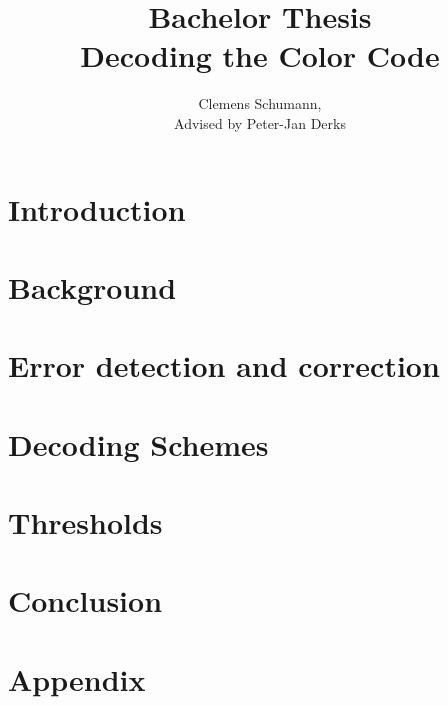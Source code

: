 \documentclass[12pt]{article}
\title{Bachelor Thesis\\ Decoding the Color Code}
\author{Clemens Schumann, \\
Advised by Peter-Jan Derks}
\begin{document}
\maketitle
\begin{abstract}
    \begin{center}
        
    \end{center}
\end{abstract}
\newpage

\tableofcontents
\newpage
\clearpage
{}
\setcounter{page}{1}
\section{Introduction}


\section{Background}\label{sec:background}

\newpage
\section{Error detection and correction}\label{sec:errordetection}

\newpage
\section{Decoding Schemes}\label{sec:decodingschemes}

\section{Thresholds}\label{sec:thresholds}

\section{Conclusion}

\newpage


\newpage
\section{Appendix}




\newpage

\end{document}
